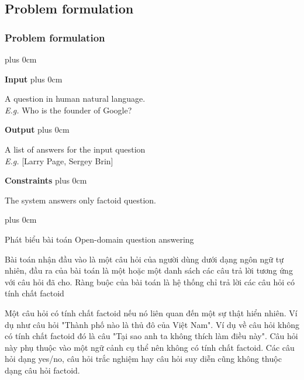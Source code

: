 \documentclass[11pt]{beamer}
\renewcommand{\raggedright}{\leftskip=0pt \rightskip=0pt plus 0cm}
\let\olditemize=\itemize
\renewenvironment{itemize}{\olditemize\raggedright}{\endlist}
\begin{document}
\subsection{Problem formulation}
\begin{frame}
	\begin{adjustwidth}{-2em}{1em}
		\frametitle{Problem formulation}
		\begin{itemize}
			\item \textbf{Input} 
			\begin{itemize}
				\item A question in human natural language.\\[5pt]
				\textit{E.g.} Who is the founder of Google?
			\end{itemize}
			\item \textbf{Output}
			\begin{itemize}
				\item A list of answers for the input question \\[5pt]
				\textit{E.g.} [Larry Page, Sergey Brin]
			\end{itemize}
			\item \textbf{Constraints}
			\begin{itemize}
				\item The system answers only factoid question.
			\end{itemize}
		\end{itemize}
	\end{adjustwidth}
\end{frame}
\begin{frame}
\begin{itemize}
	\item Phát biểu bài toán Open-domain question answering
	\item Bài toán nhận đầu vào là một câu hỏi của người dùng dưới dạng ngôn ngữ tự nhiên, đầu ra của bài toán là một hoặc một danh sách các câu trả lời tương ứng với câu hỏi đã cho. Ràng buộc của bài toán là hệ thống chỉ trả lời các câu hỏi có tính chất factoid
	\item Một câu hỏi có tính chất factoid nếu nó liên quan đến một sự thật hiển nhiên. Ví dụ như câu hỏi "Thành phố nào là thủ đô của Việt Nam". Ví dụ về câu hỏi không có tính chất factoid đó là câu "Tại sao anh ta không thích làm điều này". Câu hỏi này phụ thuộc vào một ngữ cảnh cụ thể nên không có tính chất factoid. Các câu hỏi dạng yes/no, câu hỏi trắc nghiệm hay câu hỏi suy diễn cũng không thuộc dạng câu hỏi factoid.
\end{itemize}
\end{frame}
\end{document}
